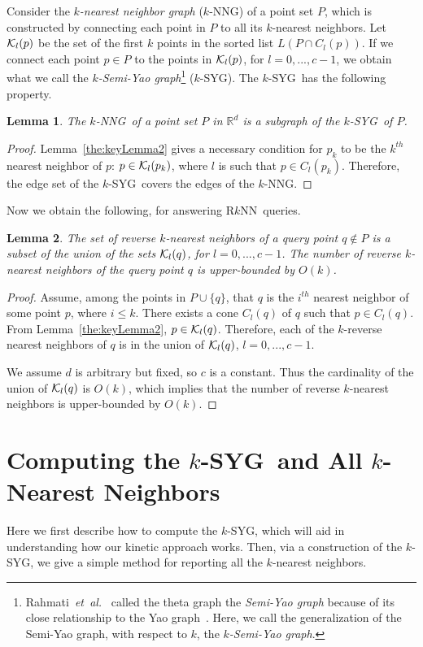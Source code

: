 \documentclass[preprint,12pt]{elsarticle}
\def\rknn{\mbox{R$k$NN}}
\def\knng{\mbox{$k$-NNG}}
\def\ksyg{\mbox{$k$-SYG}}
\newcommand{\etal}{\emph{et~al.}}
\newtheorem{lemma}{Lemma}[section]
\begin{document}
Consider the \textit{$k$-nearest neighbor graph} (\knng) of a point set $P$, which is constructed by connecting each point in $P$ to all its $k$-nearest neighbors. Let ${\cal K}_l(p)$ be the set of the first $k$ points in the sorted list $L(P\cap C_l(p))$. If we connect each point $p\in P$ to the points in ${\cal K}_l(p)$, for $l=0,...,c-1$, we obtain what we call the \textit{$k$-Semi-Yao graph}\footnote{Rahmati~\etal~\cite{Rahmati2014} called the theta graph the \textit{Semi-Yao graph} because of its close relationship to the Yao graph~\cite{DBLP:journals/siamcomp/Yao82}. Here, we call the generalization of the Semi-Yao graph, with respect to $k$, the \textit{$k$-Semi-Yao graph}.} (\ksyg). The \ksyg~has the following property. 

\begin{lemma}\label{the:NNGsubSYG}
The \knng~of a point set $P$ in $\mathbb{R}^d$ is a subgraph of the \ksyg~of $P$.
\end{lemma}
\begin{proof}
Lemma~\ref{the:keyLemma2} gives a necessary condition for $p_k$ to be the $k^{th}$ nearest neighbor of $p$: $p\in {\cal K}_l(p_k)$, where $l$ is such that $p\in C_l(p_k)$.  Therefore, the edge set of the \ksyg~covers the edges of the \knng.
\end{proof}

Now we obtain the following, for answering \rknn~queries.

\begin{lemma}\label{the:RkNNsUprBnd}
The set of reverse $k$-nearest neighbors of a query point $q\notin P$ is a subset of the union of the sets ${\cal K}_l(q)$, for $l=0,...,c-1$. The number of reverse $k$-nearest neighbors of the query point $q$ is upper-bounded by $O(k)$.
\end{lemma}
\begin{proof}
Assume, among the points in $P\cup\{q\}$, that $q$ is the $i^{th}$ nearest neighbor of some point $p$, where $i\leq k$. There exists a cone $C_l(q)$ of $q$ such that $p\in C_l(q)$. From Lemma~\ref{the:keyLemma2}, $p\in {\cal K}_l(q)$. Therefore, each of the $k$-reverse nearest neighbors of $q$ is in the union of ${\cal K}_l(q)$, $l=0,...,c-1$. 

We assume $d$ is arbitrary but fixed, so $c$ is a constant. Thus the cardinality of the union of ${\cal K}_l(q)$ is $O(k)$, which implies that the number of reverse $k$-nearest neighbors is upper-bounded by $O(k)$. 
\end{proof}
\section{Computing the \ksyg~and All $k$-Nearest Neighbors}\label{sec:ReportKNNs}
Here we first describe how to compute the \ksyg, which will aid in understanding how our kinetic approach works. Then, via a construction of the \ksyg, we give a simple method for reporting all the $k$-nearest neighbors. 
\end{document}
